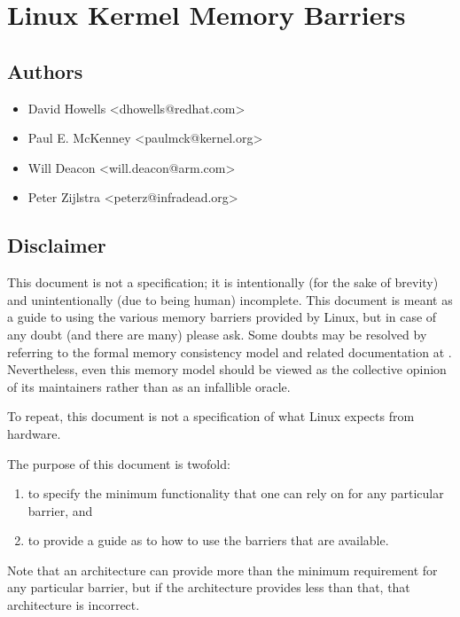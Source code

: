 \chapter{Linux Kermel Memory Barriers}

\section{Authors}

\begin{itemize}
  \item David Howells <dhowells@redhat.com>
  \item Paul E. McKenney <paulmck@kernel.org>
  \item Will Deacon <will.deacon@arm.com>
  \item Peter Zijlstra <peterz@infradead.org>
\end{itemize}

\section{Disclaimer}

This document is not a specification; it is intentionally (for the sake of
brevity) and unintentionally (due to being human) incomplete.
This document is meant as a guide to using the various memory barriers
provided by Linux, but in case of any doubt (and there are many) please ask.
Some doubts may be resolved by referring to the formal memory consistency
model and related documentation at .
Nevertheless, even this memory model should be viewed as the collective
opinion of its maintainers rather than as an infallible oracle.

To repeat, this document is not a specification of what Linux expects from
hardware.

The purpose of this document is twofold:

\begin{enumerate}
  \item to specify the minimum functionality that one can rely on for any
        particular barrier, and
  \item to provide a guide as to how to use the barriers that are available.
\end{enumerate}

Note that an architecture can provide more than the minimum requirement
for any particular barrier, but if the architecture provides less than
that, that architecture is incorrect.

